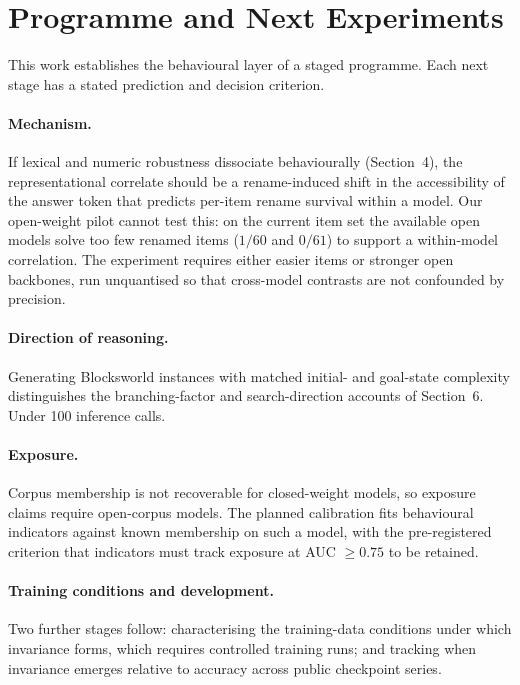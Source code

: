\documentclass{article}
\begin{document}
\section{Programme and Next Experiments}

This work establishes the behavioural layer of a staged programme. Each next stage
has a stated prediction and decision criterion.

\paragraph{Mechanism.} If lexical and numeric robustness dissociate behaviourally
(Section~4), the representational correlate should be a rename-induced shift in the
accessibility of the answer token that predicts per-item rename survival within a
model. Our open-weight pilot cannot test this: on the current item set the available
open models solve too few renamed items ($1/60$ and $0/61$) to support a
within-model correlation. The experiment requires either easier items or stronger
open backbones, run unquantised so that cross-model contrasts are not confounded by
precision.

\paragraph{Direction of reasoning.} Generating Blocksworld instances with matched
initial- and goal-state complexity distinguishes the branching-factor and
search-direction accounts of Section~6. Under 100 inference calls.

\paragraph{Exposure.} Corpus membership is not recoverable for closed-weight models,
so exposure claims require open-corpus models. The planned calibration fits
behavioural indicators against known membership on such a model, with the
pre-registered criterion that indicators must track exposure at AUC $\ge 0.75$ to be
retained.

\paragraph{Training conditions and development.} Two further stages follow:
characterising the training-data conditions under which invariance forms, which
requires controlled training runs; and tracking when invariance emerges relative to
accuracy across public checkpoint series.
\end{document}
